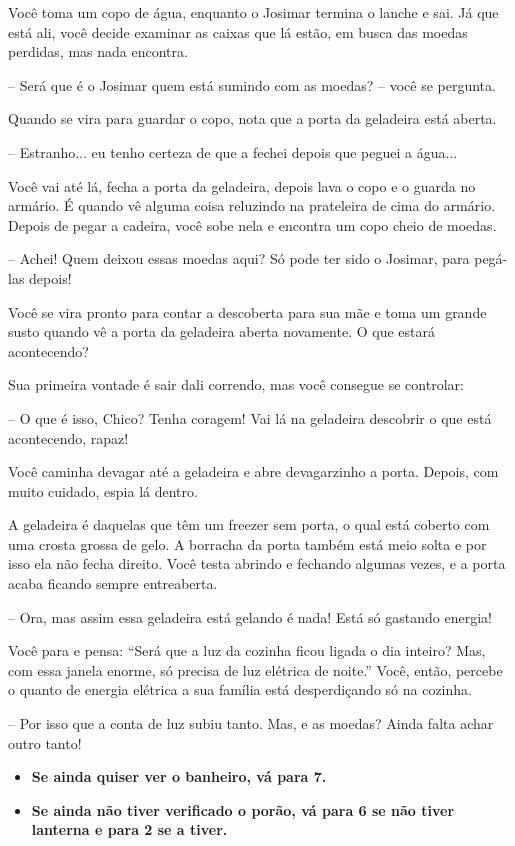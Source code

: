 Você toma um copo de água, enquanto o Josimar termina o lanche e sai. Já que está ali, você decide examinar as caixas que lá estão, em busca das moedas perdidas, mas nada encontra.

-- Será que é o Josimar quem está sumindo com as moedas? -- você se pergunta.

Quando se vira para guardar o copo, nota que a porta da geladeira está aberta.

-- Estranho... eu tenho certeza de que a fechei depois que peguei a água...

Você vai até lá, fecha a porta da geladeira, depois lava o copo e o guarda no armário. É quando vê alguma coisa reluzindo na prateleira de cima do armário. Depois de pegar a cadeira, você sobe nela e encontra um copo cheio de moedas.

-- Achei! Quem deixou essas moedas aqui? Só pode ter sido o Josimar, para pegá-las depois!

Você se vira pronto para contar a descoberta para sua mãe e toma um grande susto quando vê a porta da geladeira aberta novamente. O que estará acontecendo?

Sua primeira vontade é sair dali correndo, mas você consegue se controlar:

-- O que é isso, Chico? Tenha coragem! Vai lá na geladeira descobrir o que está acontecendo, rapaz!

Você caminha devagar até a geladeira e abre devagarzinho a porta. Depois, com muito cuidado, espia lá dentro.

A geladeira é daquelas que têm um freezer sem porta, o qual está coberto com uma crosta grossa de gelo. A borracha da porta também está meio solta e por isso ela não fecha direito. Você testa abrindo e fechando algumas vezes, e a porta acaba ficando sempre entreaberta.

-- Ora, mas assim essa geladeira está gelando é nada! Está só gastando energia!

Você para e pensa: “Será que a luz da cozinha ficou ligada o dia inteiro? Mas, com essa janela enorme, só precisa de luz elétrica de noite.” Você, então, percebe o quanto de energia elétrica a sua família está desperdiçando só na cozinha.

-- Por isso que a conta de luz subiu tanto. Mas, e as moedas? Ainda falta achar outro tanto!

\begin{itemize}
	\item \textbf{Se ainda quiser ver o banheiro, vá para 7.}
	\item \textbf{Se ainda não tiver verificado o porão, vá para 6 se não tiver lanterna e para 2 se a tiver.}
\end{itemize}

